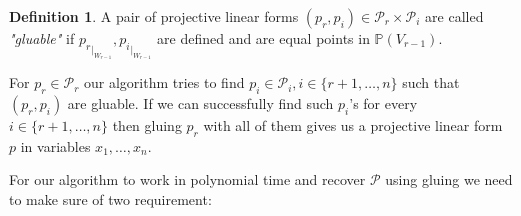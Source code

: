 \documentclass[12pt]{caltech_thesis}
\theoremstyle{plain}
\theoremstyle{definition}
\newtheorem{definition}{Definition}
\newcommand{\MP}{\mathcal{P}}
\newcommand{\PP}{\mathbb{P}}
\begin{document}
\begin{definition}
 A pair of   projective linear forms $(p_r,p_i) \in \MP_r\times \MP_i$ are called \emph{"gluable"} if
 ${p_r}_{|_{W_{r-1}}}, {p_i}_{|_{W_{r-1}}}$ are defined and are equal points in $\PP(V_{r-1})$.
 \end{definition}


For $p_r\in \MP_r$ our algorithm tries to find $p_i\in \MP_i, i\in \{r+1,\ldots,n\}$ such that $(p_r,p_i)$ are gluable. If we can successfully find such
$p_i$'s for every $i\in \{r+1,\ldots,n\}$ then gluing $p_r$ with all of them gives us a projective linear form $p$ in variables
$x_1,\ldots,x_n$.




For our algorithm to work in polynomial time and
recover $\MP$ using gluing we need to make sure
of two requirement:
\end{document}
